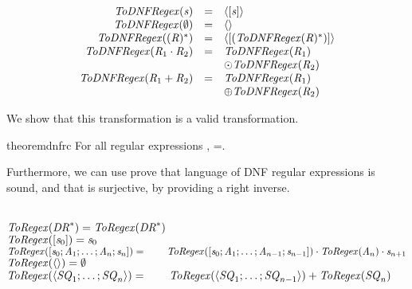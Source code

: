 \begin{definition}
\leavevmode
\[
\begin{array}{rcl}
\mathit{ToDNFRegex}(\mathit{s}) & = & \langle[\mathit{s}]\rangle\\
\mathit{ToDNFRegex}(\emptyset) & = & \langle\rangle\\
\mathit{ToDNFRegex}((\mathit{R})^*) & = & \langle[(\mathit{ToDNFRegex}(\mathit{R})^*)]\rangle\\
\mathit{ToDNFRegex}(\mathit{R}_1\cdot\mathit{R}_2) & = & \mathit{ToDNFRegex}(\mathit{R}_1)\\
& & \odot \mathit{ToDNFRegex}(\mathit{R}_2)\\
\mathit{ToDNFRegex}(\mathit{R}_1+\mathit{R}_2) & = & \mathit{ToDNFRegex}(\mathit{R}_1)\\
& & \oplus \mathit{ToDNFRegex}(\mathit{R}_2)\\
\end{array}
\]
\end{definition}
We show that this transformation is a valid transformation.
\begin{restatable}{theorem}{dnfrc}
\label{thm:completeness-dnf-lenses}
For all regular expressions \Regex{},
\LanguageOf{\ToDNFRegex(\Regex)}=\LanguageOf{\Regex{}}.
\end{restatable}


Furthermore, we can use prove that language of DNF regular expressions is sound,
and that \ToDNFRegex{} is surjective, by providing a right inverse.

\begin{definition}\leavevmode\\
$\mathit{ToRegex}(\mathit{DR}^*) = \mathit{ToRegex}(\mathit{DR}^*)$\\
$\mathit{ToRegex}([\mathit{s}_0]) = \mathit{s}_0$\\
$\mathit{ToRegex}([\mathit{s}_0;\mathit{A}_1;\ldots
;\mathit{A}_n;\mathit{s}_n]) =\\
\hspace*{2em}\mathit{ToRegex}([\mathit{s}_0;\mathit{A}_1;
\ldots;\mathit{A}_{n-1};\mathit{s}_{n-1}])
\cdot \mathit{ToRegex}(\mathit{A}_n) \cdot \mathit{s}_{n+1}$\\
$\mathit{ToRegex}(\langle\rangle)=\emptyset$\\
$\mathit{ToRegex}(\langle\mathit{SQ}_1;\ldots;\mathit{SQ}_n\rangle)=\\
\hspace*{2em}\mathit{ToRegex}(\langle\mathit{SQ}_1;\ldots;\mathit{SQ}_{n-1}\rangle)
+ \mathit{ToRegex}(\mathit{SQ}_n)$
\end{definition}

